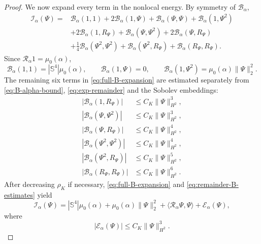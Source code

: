 \documentclass[11pt]{article}
\numberwithin{equation}{section}
\begin{document}
\begin{proof}
We now expand every term in the nonlocal energy. By symmetry of
\(\mathcal B_{\alpha}\),
\begin{equation}\label{eq:full-B-expansion}
\begin{aligned}
\mathcal I_{\alpha}(\Psi)
={}&\mathcal B_{\alpha}(1,1)
+2\mathcal B_{\alpha}(1,\Psi)
+\mathcal B_{\alpha}(\Psi,\Psi)
+\mathcal B_{\alpha}(1,\Psi^{2})\\
&+2\mathcal B_{\alpha}(1,R_{\Psi})
+\mathcal B_{\alpha}(\Psi,\Psi^{2})
+2\mathcal B_{\alpha}(\Psi,R_{\Psi})\\
&+\frac14\mathcal B_{\alpha}(\Psi^{2},\Psi^{2})
+\mathcal B_{\alpha}(\Psi^{2},R_{\Psi})
+\mathcal B_{\alpha}(R_{\Psi},R_{\Psi}).
\end{aligned}
\end{equation}
Since \(\mathcal R_{\alpha}1=\mu_{0}(\alpha)\),
\[
\mathcal B_{\alpha}(1,1)=|\mathbb S^{4}|\mu_{0}(\alpha),
\qquad
\mathcal B_{\alpha}(1,\Psi)=0,
\qquad
\mathcal B_{\alpha}(1,\Psi^{2})=\mu_{0}(\alpha)\|\Psi\|_{2}^{2}.
\]
The remaining six terms in \eqref{eq:full-B-expansion} are estimated separately
from \eqref{eq:B-alpha-bound}, \eqref{eq:exp-remainder} and the Sobolev
embeddings:
\begin{equation}\label{eq:remainder-B-estimates}
\begin{aligned}
|\mathcal B_{\alpha}(1,R_{\Psi})|
&\leq C_K\|\Psi\|_{H^{2}}^{3},\\
|\mathcal B_{\alpha}(\Psi,\Psi^{2})|
&\leq C_K\|\Psi\|_{H^{2}}^{3},\\
|\mathcal B_{\alpha}(\Psi,R_{\Psi})|
&\leq C_K\|\Psi\|_{H^{2}}^{4},\\
|\mathcal B_{\alpha}(\Psi^{2},\Psi^{2})|
&\leq C_K\|\Psi\|_{H^{2}}^{4},\\
|\mathcal B_{\alpha}(\Psi^{2},R_{\Psi})|
&\leq C_K\|\Psi\|_{H^{2}}^{5},\\
|\mathcal B_{\alpha}(R_{\Psi},R_{\Psi})|
&\leq C_K\|\Psi\|_{H^{2}}^{6}.
\end{aligned}
\end{equation}
After decreasing \(\rho_K\) if necessary, \eqref{eq:full-B-expansion} and
\eqref{eq:remainder-B-estimates} yield
\begin{equation}\label{eq:I-expansion}
\mathcal I_{\alpha}(\Psi)
=|\mathbb S^{4}|\mu_{0}(\alpha)
+\mu_{0}(\alpha)\|\Psi\|_{2}^{2}
+\langle\mathcal R_{\alpha}\Psi,\Psi\rangle
+\mathcal E_{\alpha}(\Psi),
\end{equation}
where
\begin{equation*}
|\mathcal E_{\alpha}(\Psi)|
\leq C_K\|\Psi\|_{H^{2}}^{3}.

\end{equation*}
\end{proof}
\end{document}
